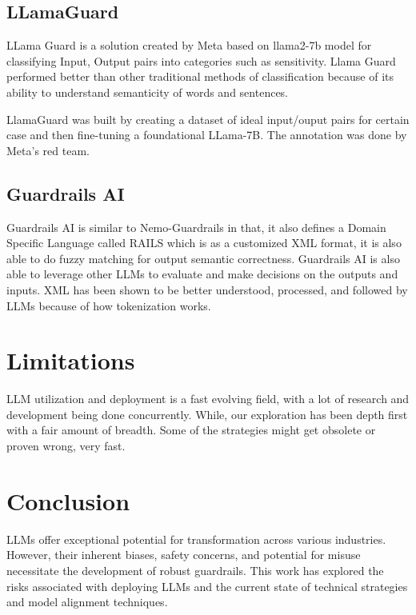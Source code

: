 \documentclass[11pt]{article}
\begin{document}
\subsection{ LLamaGuard }

LLama Guard \cite{inan2023llama} is a solution created by Meta based on llama2-7b model for classifying Input, Output pairs into categories such as sensitivity. Llama Guard performed better than other traditional methods of classification because of its ability to understand semanticity of words and sentences.

LlamaGuard was built by  creating a dataset of ideal input/ouput pairs for certain case and then fine-tuning a foundational LLama-7B. The annotation was done by Meta's red team.


\subsection{Guardrails AI}

Guardrails AI is similar to Nemo-Guardrails in that, it also defines a Domain Specific Language called RAILS which is as a customized XML format, it is also able to do fuzzy matching for output semantic correctness. Guardrails AI is also able to leverage other LLMs to evaluate and make decisions on the outputs and inputs.
XML has been shown to be better understood, processed, and followed by LLMs because of how tokenization works.


\section{ Limitations }

LLM utilization and deployment is a fast evolving field, with a lot of research and development being done concurrently. While, our exploration has been depth first with a fair amount of breadth. Some of the strategies might get obsolete or proven wrong, very fast.


\section{ Conclusion }

LLMs offer exceptional potential for transformation across various industries. However, their inherent biases, safety concerns, and potential for misuse necessitate the development of robust guardrails. This work has explored the risks associated with deploying LLMs and the current state of technical strategies and model alignment techniques.
\end{document}
